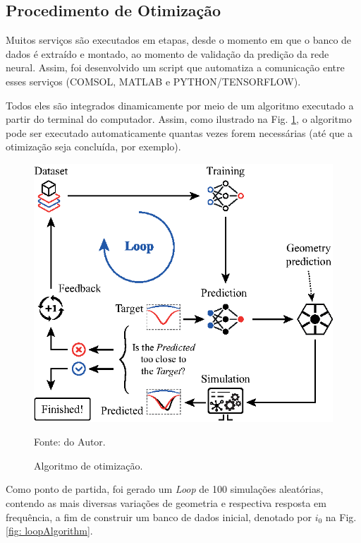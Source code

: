 \subsection{Procedimento de Otimização}

Muitos serviços são executados em etapas, desde o momento em que o banco de dados é extraído e montado, ao momento de validação da predição da rede neural. Assim, foi desenvolvido um script que automatiza a comunicação entre esses serviços (COMSOL, MATLAB e PYTHON/TENSORFLOW).

Todos eles são integrados dinamicamente por meio de um algoritmo executado a partir do terminal do computador. Assim, como ilustrado na Fig. \ref{fig: OptimizationAlgorithm}, o algoritmo pode ser executado automaticamente quantas vezes forem necessárias (até que a otimização seja concluída, por exemplo).

\begin{figure}[H]
    \centering
    \includegraphics{04-Figuras/OptimizationAlgorithm.eps}
    \caption{Algoritmo de otimização.} \par
    Fonte: do Autor.
    \label{fig: OptimizationAlgorithm}
\end{figure}

Como ponto de partida, foi gerado um \textit{Loop} de 100 simulações aleatórias, contendo as mais diversas variações de geometria e respectiva resposta em frequência, a fim de construir um banco de dados inicial, denotado por $i_{0}$ na Fig. \ref{fig: loopAlgorithm}.

